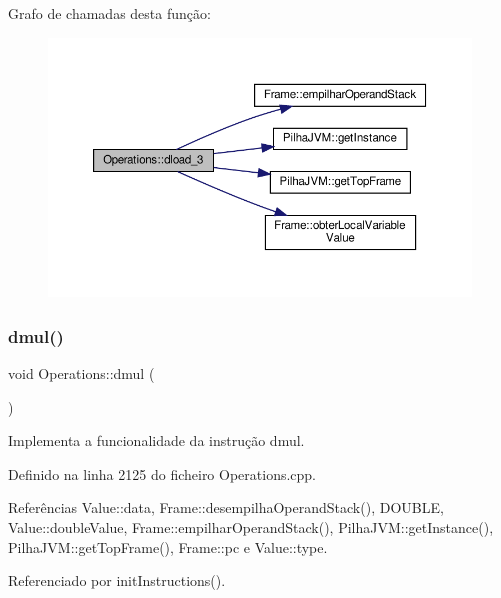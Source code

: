 Grafo de chamadas desta função\+:
\nopagebreak
\begin{figure}[H]
\begin{center}
\leavevmode
\includegraphics[width=350pt]{classOperations_ab3a0a107f5c4a791c71b727142a69523_cgraph}
\end{center}
\end{figure}
\mbox{\label{classOperations_afe1944066f35f66d588d1a28124ebb55}} 
\subsubsection{\texorpdfstring{dmul()}{dmul()}}
{\footnotesize\ttfamily void Operations\+::dmul (\begin{DoxyParamCaption}{ }\end{DoxyParamCaption})\hspace{0.3cm}{\ttfamily [private]}}



Implementa a funcionalidade da instrução dmul. 



Definido na linha 2125 do ficheiro Operations.\+cpp.



Referências Value\+::data, Frame\+::desempilha\+Operand\+Stack(), D\+O\+U\+B\+LE, Value\+::double\+Value, Frame\+::empilhar\+Operand\+Stack(), Pilha\+J\+V\+M\+::get\+Instance(), Pilha\+J\+V\+M\+::get\+Top\+Frame(), Frame\+::pc e Value\+::type.



Referenciado por init\+Instructions().

